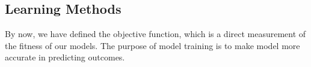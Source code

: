 \subsection {Learning Methods}
By now, we have defined the objective function, which is a direct measurement of the fitness of our models. The purpose of model training is to make model more accurate in predicting outcomes. 